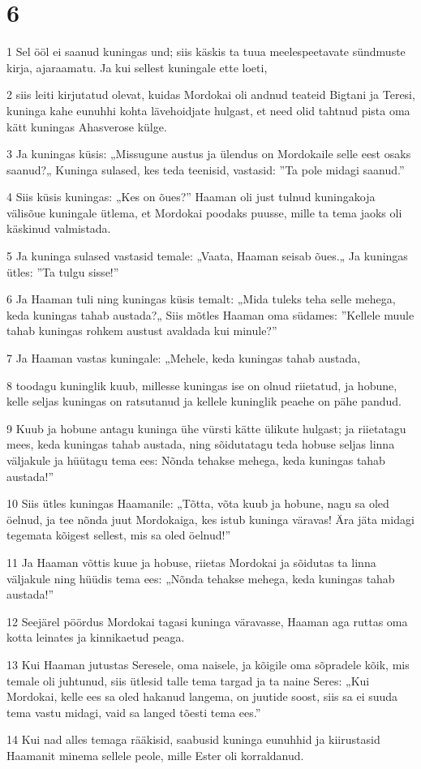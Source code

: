 \chapter{6}

\par 1 Sel ööl ei saanud kuningas und; siis käskis ta tuua meelespeetavate sündmuste kirja, ajaraamatu. Ja kui sellest kuningale ette loeti,
\par 2 siis leiti kirjutatud olevat, kuidas Mordokai oli andnud teateid Bigtani ja Teresi, kuninga kahe eunuhhi kohta lävehoidjate hulgast, et need olid tahtnud pista oma kätt kuningas Ahasverose külge.
\par 3 Ja kuningas küsis: „Missugune austus ja ülendus on Mordokaile selle eest osaks saanud?„ Kuninga sulased, kes teda teenisid, vastasid: ”Ta pole midagi saanud.”
\par 4 Siis küsis kuningas: „Kes on õues?” Haaman oli just tulnud kuningakoja välisõue kuningale ütlema, et Mordokai poodaks puusse, mille ta tema jaoks oli käskinud valmistada.
\par 5 Ja kuninga sulased vastasid temale: „Vaata, Haaman seisab õues.„ Ja kuningas ütles: ”Ta tulgu sisse!”
\par 6 Ja Haaman tuli ning kuningas küsis temalt: „Mida tuleks teha selle mehega, keda kuningas tahab austada?„ Siis mõtles Haaman oma südames: ”Kellele muule tahab kuningas rohkem austust avaldada kui minule?”
\par 7 Ja Haaman vastas kuningale: „Mehele, keda kuningas tahab austada,
\par 8 toodagu kuninglik kuub, millesse kuningas ise on olnud riietatud, ja hobune, kelle seljas kuningas on ratsutanud ja kellele kuninglik peaehe on pähe pandud.
\par 9 Kuub ja hobune antagu kuninga ühe vürsti kätte ülikute hulgast; ja riietatagu mees, keda kuningas tahab austada, ning sõidutatagu teda hobuse seljas linna väljakule ja hüütagu tema ees: Nõnda tehakse mehega, keda kuningas tahab austada!”
\par 10 Siis ütles kuningas Haamanile: „Tõtta, võta kuub ja hobune, nagu sa oled öelnud, ja tee nõnda juut Mordokaiga, kes istub kuninga väravas! Ära jäta midagi tegemata kõigest sellest, mis sa oled öelnud!”
\par 11 Ja Haaman võttis kuue ja hobuse, riietas Mordokai ja sõidutas ta linna väljakule ning hüüdis tema ees: „Nõnda tehakse mehega, keda kuningas tahab austada!”
\par 12 Seejärel pöördus Mordokai tagasi kuninga väravasse, Haaman aga ruttas oma kotta leinates ja kinnikaetud peaga.
\par 13 Kui Haaman jutustas Seresele, oma naisele, ja kõigile oma sõpradele kõik, mis temale oli juhtunud, siis ütlesid talle tema targad ja ta naine Seres: „Kui Mordokai, kelle ees sa oled hakanud langema, on juutide soost, siis sa ei suuda tema vastu midagi, vaid sa langed tõesti tema ees.”
\par 14 Kui nad alles temaga rääkisid, saabusid kuninga eunuhhid ja kiirustasid Haamanit minema sellele peole, mille Ester oli korraldanud.


